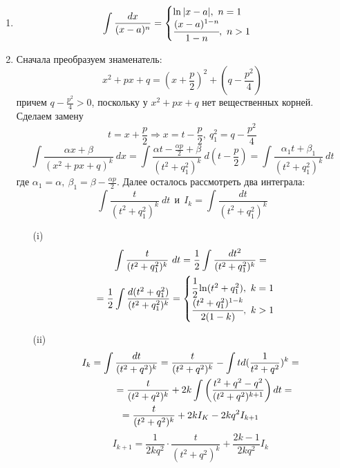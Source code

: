 \begin{enumerate}
    \item \[\int\frac{dx}{(x-a)^n}  = \begin{cases}\ln|x-a|,\ n = 1\\ \cfrac{(x-a)^{1-n}}{1-n}, \ n > 1\end{cases}\]
    \item Сначала преобразуем знаменатель:
    \[x^2+px+q=(x+\frac{p}{2})^2+(q-\frac{p^2}{4})\]
    причем $q-\frac{p^2}{4}>0$, поскольку у $x^2+px+q$ нет вещественных корней. Сделаем замену 
    \[t=x+\frac{p}{2} \Rightarrow x= t-\frac{p}{2},\ q_1^2=q-\frac{p^2}{4}\]
    \[\int\frac{\alpha x+\beta}{(x^2+px+q)^k}\ dx = \int \frac{\alpha t-\frac{\alpha p}{2}+\beta}{(t^2+q_1^2)^k}\ d(t-\frac{p}{2})=\int \frac{\alpha_1 t+\beta_1}{(t^2+q_1^2)^k}\ dt\]
    где $\alpha_1=\alpha,\ \beta_1=\beta-\frac{\alpha p}{2}$. Далее осталось рассмотреть два интеграла:
    \[\int \frac{t}{(t^2+q_1^2)^k}\ dt\ \ \text{и}\ \ I_k=\int \frac{dt}{(t^2+q_1^2)^k}\]
    \begin{itemize}
        \item[(i)] 
        \begin{multline*}
            \int\frac{t}{(t^2+q_1^2)^k}\ dt = \frac{1}{2}\int\frac{dt^2}{(t^2+q_1^2)^k} =\\
            = \frac{1}{2}\int\frac{d(t^2+q_1^2)}{(t^2+q_1^2)^k} = \begin{cases}\cfrac{1}{2}\ln(t^2+q_1^2),\ k = 1\\ \cfrac{(t^2+q_1^2)^{1-k}}{2(1-k)}, \ k > 1\end{cases}
        \end{multline*}
        \item[(ii)] 
        \begin{multline*}
            I_k=\int \frac{dt}{(t^2+q^2)^k}=\frac{t}{(t^2+q^2)^k}-\int t d(\frac{1}{t^2+q^2})^k=\\
            \tab[1cm]=\frac{t}{(t^2+q^2)^k}+2k\int \left(\frac{t^2+q^2-q^2}{(t^2+q^2)^{k+1}}\right)dt=\\
            =\frac{t}{(t^2+q^2)^k}+2kI_K-2kq^2 I_{k+1}
        \end{multline*}
        \[I_{k+1}=\frac{1}{2kq^2}\cdot \frac{t}{(t^2+q^2)^k}+\frac{2k-1}{2kq^2}I_k\]
    \end{itemize}
\end{enumerate}